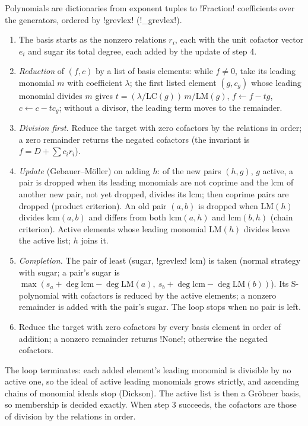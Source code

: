 {{{\begin{algorithm}\label{alg:lean-export-lift}
Polynomials are dictionaries from exponent tuples to \lexpy!Fraction! coefficients over the
generators, ordered by \lexcode!grevlex! (\lexpy!_grevlex!).
\begin{enumerate}
\item The basis starts as the nonzero relations $r_i$, each with the unit cofactor vector
$e_i$ and sugar its total degree, each added by the update of step 4.
\item \emph{Reduction} of $(f, c)$ by a list of basis elements: while $f\neq 0$, take its
leading monomial $m$ with coefficient $\lambda$; the first listed element $(g, c_g)$ whose
leading monomial divides $m$ gives $t = (\lambda/\mathrm{LC}(g))\, m/\mathrm{LM}(g)$,
$f \gets f - tg$, $c \gets c - t c_g$; without a divisor, the leading term moves to the
remainder.
\item \emph{Division first.} Reduce the target with zero cofactors by the relations in order;
a zero remainder returns the negated cofactors (the invariant is $f = D + \sum c_i r_i$).
\item \emph{Update} (Gebauer--Möller) on adding $h$: of the new pairs $(h,g)$, $g$ active, a
pair is dropped when its leading monomials are not coprime and the lcm of another new pair, not
yet dropped, divides its lcm; then coprime pairs are dropped (product criterion). An old pair
$(a,b)$ is dropped when $\mathrm{LM}(h)$ divides $\mathrm{lcm}(a,b)$ and differs from both
$\mathrm{lcm}(a,h)$ and $\mathrm{lcm}(b,h)$ (chain criterion). Active elements whose leading
monomial $\mathrm{LM}(h)$ divides leave the active list; $h$ joins it.
\item \emph{Completion.} The pair of least (sugar, \lexcode!grevlex! lcm) is taken (normal
strategy with sugar; a pair's sugar is
$\max(s_a + \deg\mathrm{lcm} - \deg\mathrm{LM}(a),\ s_b + \deg\mathrm{lcm} - \deg\mathrm{LM}(b))$).
Its S-polynomial with cofactors is reduced by the active elements; a nonzero remainder is added
with the pair's sugar. The loop stops when no pair is left.
\item Reduce the target with zero cofactors by every basis element in order of addition; a
nonzero remainder returns \lexpy!None!; otherwise the negated cofactors.
\end{enumerate}
The loop terminates: each added element's leading monomial is divisible by no active one, so
the ideal of active leading monomials grows strictly, and ascending chains of monomial ideals
stop (Dickson). The active list is then a Gröbner basis, so membership is decided exactly.
When step 3 succeeds, the cofactors are those of division by the relations in order.
\end{algorithm}

}}}
